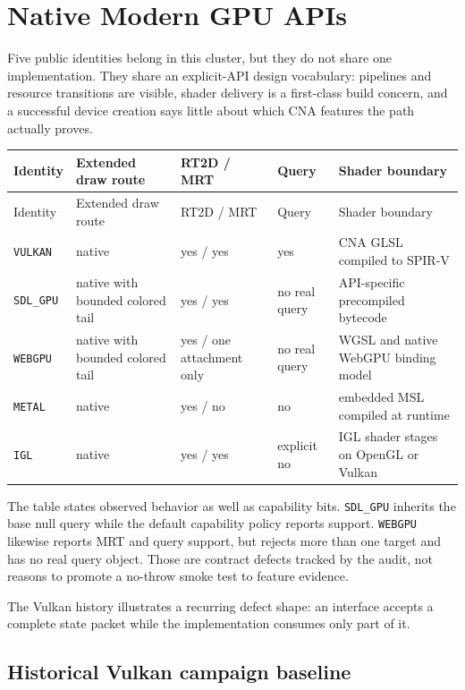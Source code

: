 \chapter{Native Modern GPU APIs}
\label{ch:native-modern-gpu}
\label{ch:vulkan-backend}

Five public identities belong in this cluster, but they do not share one implementation.
They share an explicit-API design vocabulary: pipelines and resource transitions are visible,
shader delivery is a first-class build concern, and a successful device creation says little
about which CNA features the path actually proves.

\begin{longtable}{p{}p{}p{}p{}p{}}
\toprule
Identity & Extended draw route & RT2D / MRT & Query & Shader boundary \\
\midrule
\endfirsthead
\toprule
Identity & Extended draw route & RT2D / MRT & Query & Shader boundary \\
\midrule
\endhead
\texttt{VULKAN} & native & yes / yes & yes & CNA GLSL compiled to SPIR-V \\
\texttt{SDL\_GPU} & native with bounded colored tail & yes / yes & no real query & API-specific precompiled bytecode \\
\texttt{WEBGPU} & native with bounded colored tail & yes / one attachment only & no real query & WGSL and native WebGPU binding model \\
\texttt{METAL} & native & yes / no & no & embedded MSL compiled at runtime \\
\texttt{IGL} & native & yes / yes & explicit no & IGL shader stages on OpenGL or Vulkan \\
\bottomrule
\end{longtable}

The table states observed behavior as well as capability bits. \texttt{SDL\_GPU} inherits the base
null query while the default capability policy reports support.  \texttt{WEBGPU} likewise
reports MRT and query support, but rejects more than one target and has no real query object.
Those are contract defects tracked by the audit, not reasons to promote a no-throw smoke test
to feature evidence.

The Vulkan history illustrates a recurring defect shape: an interface accepts a complete state
packet while the implementation consumes only part of it.

\section{Historical Vulkan campaign baseline}


